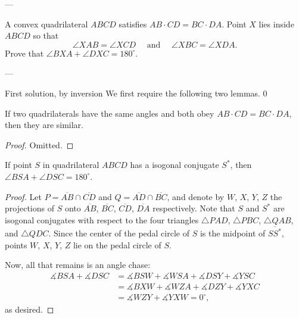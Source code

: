 
---

A convex quadrilateral $ABCD$ satisfies $AB\cdot CD=BC\cdot DA$. Point $X$ lies inside $ABCD$ so that \[\angle XAB=\angle{XCD}\quad\text{ and }\quad\angle XBC=\angle XDA.\]
Prove that $\angle BXA+\angle DXC=180^\circ$.

---

\begin{customenv}{First solution, by inversion}
    We first require the following two lemmas.
    \setcounter{boxlemma}0
    \begin{boxlemma}
        If two quadrilaterals have the same angles and both obey $AB\cdot CD=BC\cdot DA$, then they are similar.
    \end{boxlemma}
    \begin{proof}
        Omitted.
    \end{proof}
    \begin{boxlemma}
        If point $S$ in quadrilateral $ABCD$ has a isogonal conjugate $S^*$, then $\angle BSA+\angle DSC=180^\circ$.
    \end{boxlemma}
    \begin{proof}
        Let $P=\overline{AB}\cap\overline{CD}$ and $Q=\overline{AD}\cap\overline{BC}$, and denote by $W$, $X$, $Y$, $Z$ the projections of $S$ onto $\overline{AB}$, $\overline{BC}$, $\overline{CD}$, $\overline{DA}$ respectively. Note that $S$ and $S^*$ are isogonal conjugates with respect to the four triangles $\triangle PAD$, $\triangle PBC$, $\triangle QAB$, and $\triangle QDC$. Since the center of the pedal circle of $S$ is the midpoint of $\overline{SS^*}$, points $W$, $X$, $Y$, $Z$ lie on the pedal circle of $S$.

        Now, all that remains is an angle chase:
        \begin{align*}
            \measuredangle BSA+\measuredangle DSC&=\measuredangle BSW+\measuredangle WSA+\measuredangle DSY+\measuredangle YSC\\
            &=\measuredangle BXW+\measuredangle WZA+\measuredangle DZY+\measuredangle YXC\\
            &=\measuredangle WZY+\measuredangle YXW=0^\circ,
        \end{align*}
        as desired.
    \end{proof}


\end{customenv}

